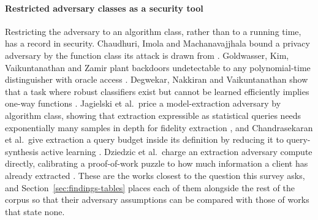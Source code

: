 \paragraph{Restricted adversary classes as a security tool}
Restricting the adversary to an algorithm class, rather than to a running time, has a
record in security. Chaudhuri, Imola and Machanavajjhala bound a privacy adversary by
the function class its attack is drawn from \cite{CIM19}. Goldwasser, Kim,
Vaikuntanathan and Zamir plant backdoors undetectable to any polynomial-time
distinguisher with oracle access \cite{GKVZ22}. Degwekar, Nakkiran and Vaikuntanathan
show that a task where robust classifiers exist but cannot be learned efficiently
implies one-way functions \cite{DNV19}. Jagielski et al.\ price a model-extraction
adversary by algorithm class, showing that extraction expressible as statistical
queries needs exponentially many samples in depth for fidelity extraction
\cite{JCBKP20}, and Chandrasekaran et al.\ give extraction a query budget inside its
definition by reducing it to query-synthesis active learning \cite{CCGJY20}. Dziedzic
et al.\ charge an extraction adversary compute directly, calibrating a proof-of-work
puzzle to how much information a client has already extracted \cite{DKLP22}. These
are the works closest to the question this survey asks, and
Section~\ref{sec:findings-tables} places each of them alongside the rest of the corpus so
that their adversary assumptions can be compared with those of works that state
none.
